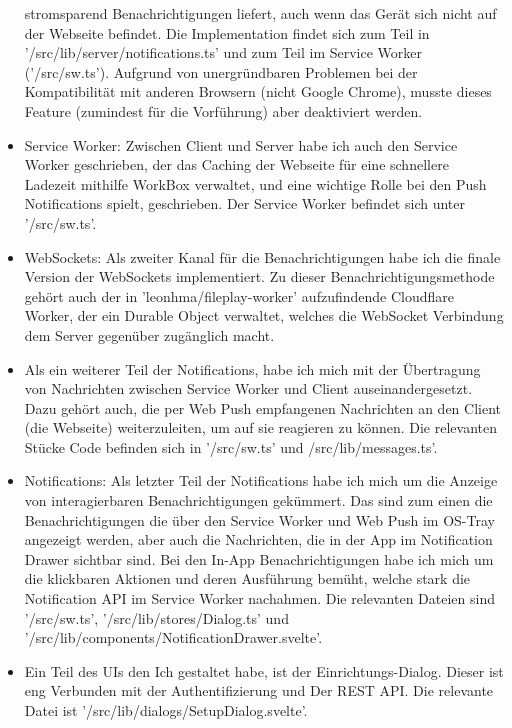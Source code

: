 \documentclass[a4paper]{article}
\begin{document}
\begin{itemize}
            stromsparend Benachrichtigungen liefert, auch wenn das Gerät sich
            nicht auf der Webseite befindet. Die Implementation findet sich zum
            Teil in '/src/lib/server/notifications.ts' und zum Teil im Service
            Worker ('/src/sw.ts'). Aufgrund von unergründbaren Problemen bei der
            Kompatibilität mit anderen Browsern (nicht Google Chrome), musste
            dieses Feature (zumindest für die Vorführung) aber deaktiviert
            werden.
      \item Service Worker: Zwischen Client und Server habe ich auch den Service
            Worker geschrieben, der das Caching der Webseite für eine schnellere
            Ladezeit mithilfe WorkBox verwaltet, und eine wichtige Rolle bei den
            Push Notifications spielt, geschrieben. Der Service Worker befindet
            sich unter '/src/sw.ts'.
      \item WebSockets: Als zweiter Kanal für die Benachrichtigungen habe ich
            die finale Version der WebSockets implementiert. Zu dieser
            Benachrichtigungsmethode gehört auch der in
            'leonhma/fileplay-worker' aufzufindende Cloudflare Worker, der ein
            Durable Object verwaltet, welches die WebSocket Verbindung dem
            Server gegenüber zugänglich macht.
      \item Als ein weiterer Teil der Notifications, habe ich mich mit der
            Übertragung von Nachrichten zwischen Service Worker und Client
            auseinandergesetzt. Dazu gehört auch, die per Web Push empfangenen
            Nachrichten an den Client (die Webseite) weiterzuleiten, um auf sie
            reagieren zu können. Die relevanten Stücke Code befinden sich in
            '/src/sw.ts' und /src/lib/messages.ts'.
      \item Notifications: Als letzter Teil der Notifications habe ich mich um
            die Anzeige von interagierbaren Benachrichtigungen gekümmert. Das
            sind zum einen die Benachrichtigungen die über den Service Worker
            und Web Push im OS-Tray angezeigt werden, aber auch die Nachrichten,
            die in der App im Notification Drawer sichtbar sind. Bei den In-App
            Benachrichtigungen habe ich mich um die klickbaren Aktionen und
            deren Ausführung bemüht, welche stark die Notification API im
            Service Worker nachahmen. Die relevanten Dateien sind '/src/sw.ts',
            '/src/lib/stores/Dialog.ts' und
            '/src/lib/components/NotificationDrawer.svelte'.
      \item Ein Teil des UIs den Ich gestaltet habe, ist der
            Einrichtungs-Dialog. Dieser ist eng Verbunden mit der
            Authentifizierung und Der REST API. Die relevante Datei ist
            '/src/lib/dialogs/SetupDialog.svelte'.
\end{itemize}
\end{document}
